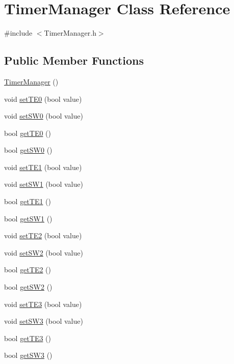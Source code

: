 \hypertarget{class_timer_manager}{
\section{TimerManager Class Reference}
\label{class_timer_manager}
}


{\ttfamily \#include $<$TimerManager.h$>$}

\subsection*{Public Member Functions}
\begin{DoxyCompactItemize}
\item 
\hyperlink{class_timer_manager_a42d72899be00f29c69df6001dfa7d766}{TimerManager} ()
\item 
void \hyperlink{class_timer_manager_a1ec1870953177c6d6bf7285f88243a49}{setTE0} (bool value)
\item 
void \hyperlink{class_timer_manager_a92fcca7111a0464bf6691a361056cfe8}{setSW0} (bool value)
\item 
bool \hyperlink{class_timer_manager_a39dd3307b16b8c3d08a6c13e21633cba}{getTE0} ()
\item 
bool \hyperlink{class_timer_manager_aacea00e8eb68b6476171a78f4616dd88}{getSW0} ()
\item 
void \hyperlink{class_timer_manager_a8f91bc116e6847ef2903c69c96fcb416}{setTE1} (bool value)
\item 
void \hyperlink{class_timer_manager_a5fcc4e14e8a923ed2c4baa9ccd3f0f36}{setSW1} (bool value)
\item 
bool \hyperlink{class_timer_manager_a1ade1eb2e2963c0b454dcb2dc74a1622}{getTE1} ()
\item 
bool \hyperlink{class_timer_manager_a677e70a7ea9b2aa40d1362ce98e0a1f2}{getSW1} ()
\item 
void \hyperlink{class_timer_manager_ad5f65c9f955b7fc7327b516f14bc144f}{setTE2} (bool value)
\item 
void \hyperlink{class_timer_manager_ac99c53f55825d886ce78018a1bd2e306}{setSW2} (bool value)
\item 
bool \hyperlink{class_timer_manager_a1cd4af7ca7a755007b7ae95786eea5f3}{getTE2} ()
\item 
bool \hyperlink{class_timer_manager_a6c46927fe0b00ec2ff84580f1af0a3a1}{getSW2} ()
\item 
void \hyperlink{class_timer_manager_adc0c84239010c3182995234b359f1abe}{setTE3} (bool value)
\item 
void \hyperlink{class_timer_manager_a491c03c0dac7b2e2925c9caa91195196}{setSW3} (bool value)
\item 
bool \hyperlink{class_timer_manager_aadf54b7a2e86e8eaedece521ed5f118d}{getTE3} ()
\item 
bool \hyperlink{class_timer_manager_ab6f0cd4bf92162e7556f2178eb2b1e6e}{getSW3} ()
\end{DoxyCompactItemize}



